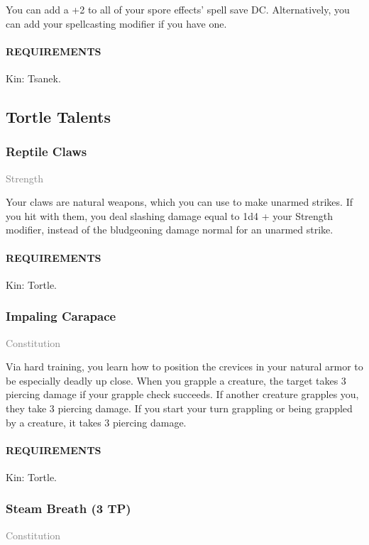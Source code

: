     \normalsize
    You can add a +2 to all of your spore effects' spell save DC.
    Alternatively, you can add your spellcasting modifier if you have one.
    \paragraph{REQUIREMENTS} Kin: Tsanek.

\subsection*{Tortle Talents}
    \subsubsection{Reptile Claws} \label{tal::reptileclaws}
    \small{\textcolor{gray}{Strength}}

    \normalsize
    Your claws are natural weapons, which you can use to make unarmed strikes.
    If you hit with them, you deal slashing damage equal to 1d4 + your Strength modifier, instead of the bludgeoning damage normal for an unarmed strike.
    \paragraph{REQUIREMENTS} Kin: Tortle.

    \subsubsection{Impaling Carapace} \label{tal::impalingcarapace}
    \small{\textcolor{gray}{Constitution}}

    \normalsize
    Via hard training, you learn how to position the crevices in your natural armor to be especially deadly up close.
    When you grapple a creature, the target takes 3 piercing damage if your grapple check succeeds.
    If another creature grapples you, they take 3 piercing damage.
    If you start your turn grappling or being grappled by a creature, it takes 3 piercing damage.
    \paragraph{REQUIREMENTS} Kin: Tortle.

    \subsubsection{Steam Breath (3 TP)} \label{tal::steambreath}
    \small{\textcolor{gray}{Constitution}}

